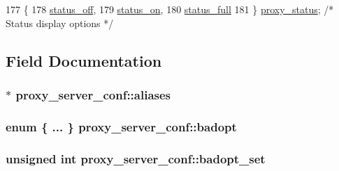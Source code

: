 \begin{DoxyCode}
177          \{
178         \hyperlink{structproxy__server__conf_a648ab4ad1d47da540a429df60ec40570a9eb0760b64268aaa7a9b009936712fdc}{status\_off},
179         \hyperlink{structproxy__server__conf_a648ab4ad1d47da540a429df60ec40570a69fcb3ac59b0bcc4abd30a2e0cfdceb2}{status\_on},
180         \hyperlink{structproxy__server__conf_a648ab4ad1d47da540a429df60ec40570a9a5f57022566554b894fbde70f0f41d2}{status\_full}
181     \} \hyperlink{structproxy__server__conf_a9f7dbf7d09b9fe19a59e0f13961b7483}{proxy\_status};             \textcolor{comment}{/* Status display options */}
\end{DoxyCode}


\subsection{Field Documentation}
\subsubsection[{\texorpdfstring{aliases}{aliases}}]{$\ast$ proxy\+\_\+server\+\_\+conf\+::aliases}\hypertarget{structproxy__server__conf_a31e08b1678de460f1b1b7454ca6bfac9}{}\label{structproxy__server__conf_a31e08b1678de460f1b1b7454ca6bfac9}
\subsubsection[{\texorpdfstring{badopt}{badopt}}]{\setlength{\rightskip}{0pt plus 5cm}enum \{ ... \}   proxy\+\_\+server\+\_\+conf\+::badopt}\hypertarget{structproxy__server__conf_a13c2a8bc7629dd5c24453ae87553f042}{}\label{structproxy__server__conf_a13c2a8bc7629dd5c24453ae87553f042}
\subsubsection[{\texorpdfstring{badopt\+\_\+set}{badopt_set}}]{\setlength{\rightskip}{0pt plus 5cm}unsigned {\bf int} proxy\+\_\+server\+\_\+conf\+::badopt\+\_\+set}\hypertarget{structproxy__server__conf_a9ecfc4640651da6dd9728acda2756d89}{}\label{structproxy__server__conf_a9ecfc4640651da6dd9728acda2756d89}
